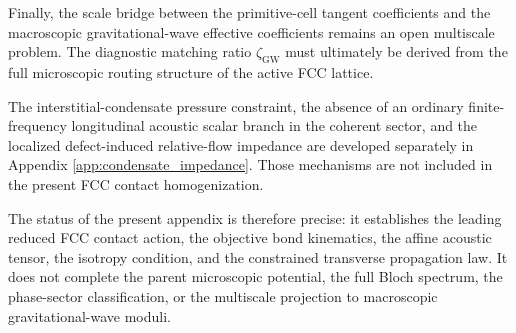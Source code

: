 Finally, the scale bridge between the primitive-cell tangent coefficients and the macroscopic gravitational-wave effective coefficients remains an open multiscale problem. The diagnostic matching ratio $\zeta_{\mathrm{GW}}$ must ultimately be derived from the full microscopic routing structure of the active FCC lattice.

The interstitial-condensate pressure constraint, the absence of an ordinary finite-frequency longitudinal acoustic scalar branch in the coherent sector, and the localized defect-induced relative-flow impedance are developed separately in Appendix \ref{app:condensate_impedance}. Those mechanisms are not included in the present FCC contact homogenization.

The status of the present appendix is therefore precise: it establishes the leading reduced FCC contact action, the objective bond kinematics, the affine acoustic tensor, the isotropy condition, and the constrained transverse propagation law. It does not complete the parent microscopic potential, the full Bloch spectrum, the phase-sector classification, or the multiscale projection to macroscopic gravitational-wave moduli.

